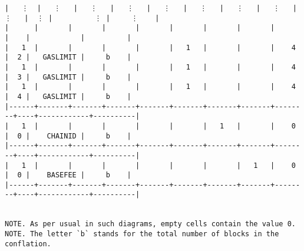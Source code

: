 \documentclass[varwidth=\maxdimen,margin=0.5cm,multi={verbatim}]{standalone}
\begin{document}
\begin{verbatim}
|   ⋮  |   ⋮   |   ⋮   |   ⋮   |   ⋮   |   ⋮   |   ⋮   |   ⋮   |    ⋮   |  ⋮ |          ⋮ |     ⋮    |
|      |       |       |       |       |       |       |       |        |    |            |          |
|   1  |       |       |       |       |   1   |       |       |    4   |  2 |   GASLIMIT |     b    |
|   1  |       |       |       |       |   1   |       |       |    4   |  3 |   GASLIMIT |     b    |
|   1  |       |       |       |       |   1   |       |       |    4   |  4 |   GASLIMIT |     b    |
|------+-------+-------+-------+-------+-------+-------+-------+--------+----+------------+----------|
|   1  |       |       |       |       |       |   1   |       |    0   |  0 |    CHAINID |     b    |
|------+-------+-------+-------+-------+-------+-------+-------+--------+----+------------+----------|
|   1  |       |       |       |       |       |       |   1   |    0   |  0 |    BASEFEE |     b    |
|------+-------+-------+-------+-------+-------+-------+-------+--------+----+------------+----------|


NOTE. As per usual in such diagrams, empty cells contain the value 0.
NOTE. The letter `b` stands for the total number of blocks in the conflation.

\end{verbatim}
\end{document}
